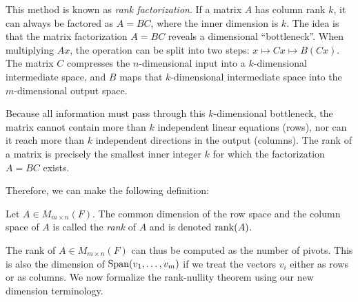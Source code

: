 \documentclass[../linear_algebra_and_groups.tex]{subfiles}
\begin{document}
\begin{remark}
    This method is known as \textit{rank factorization}. If a matrix $A$ has column rank $k$, it can always be factored as $A = BC$, where the inner dimension is $k$. The idea is that the matrix factorization $A=BC$ reveals a dimensional ``bottleneck''. When multiplying $Ax$, the operation can be split into two steps: $x \mapsto Cx \mapsto B(Cx)$. The matrix $C$ compresses the $n$-dimensional input into a $k$-dimensional intermediate space, and $B$ maps that $k$-dimensional intermediate space into the $m$-dimensional output space. 
    
    Because all information must pass through this $k$-dimensional bottleneck, the matrix cannot contain more than $k$ independent linear equations (rows), nor can it reach more than $k$ independent directions in the output (columns). The rank of a matrix is precisely the smallest inner integer $k$ for which the factorization $A=BC$ exists.
\end{remark}
Therefore, we can make the following definition:
\begin{definition}[Rank]
    \begin{shaded*}
        Let $A\in M_{m\times n}(F)$. The common dimension of the row space and the column space of $A$ is called the \textit{rank} of $A$ and is denoted $\operatorname{rank}(A)$.
    \end{shaded*}
\end{definition}

The rank of $A\in M_{m\times n}(F)$ can thus be computed as the number of pivots. This is also the dimension of $\operatorname{Span}(v_1,\dots,v_m)$ if we treat the vectors $v_i$ either as rows or as columns. We now formalize the rank-nullity theorem using our new dimension terminology.
\end{document}
